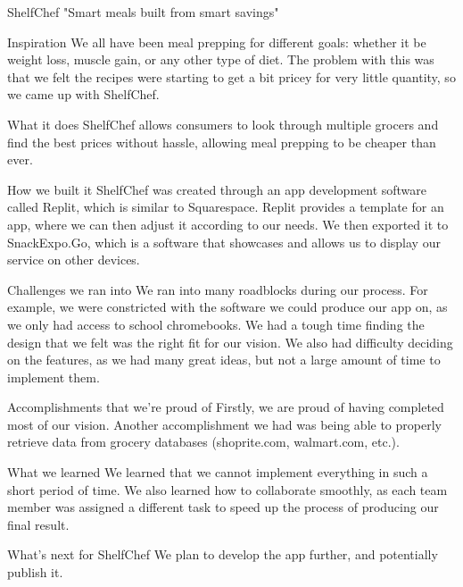 ShelfChef
"Smart meals built from smart savings"

Inspiration
We all have been meal prepping for different goals: whether it be weight loss, muscle gain, or any other type of diet. The problem with this was that we felt the recipes were starting to get a bit pricey for very little quantity, so we came up with ShelfChef.

What it does
ShelfChef allows consumers to look through multiple grocers and find the best prices without hassle, allowing meal prepping to be cheaper than ever.

How we built it
ShelfChef was created through an app development software called Replit, which is similar to Squarespace. Replit provides a template for an app, where we can then adjust it according to our needs. We then exported it to SnackExpo.Go, which is a software that showcases and allows us to display our service on other devices.

Challenges we ran into
We ran into many roadblocks during our process. For example, we were constricted with the software we could produce our app on, as we only had access to school chromebooks. We had a tough time finding the design that we felt was the right fit for our vision. We also had difficulty deciding on the features, as we had many great ideas, but not a large amount of time to implement them.

Accomplishments that we're proud of
Firstly, we are proud of having completed most of our vision. Another accomplishment we had was being able to properly retrieve data from grocery databases (shoprite.com, walmart.com, etc.).

What we learned
We learned that we cannot implement everything in such a short period of time. We also learned how to collaborate smoothly, as each team member was assigned a different task to speed up the process of producing our final result.

What's next for ShelfChef
We plan to develop the app further, and potentially publish it.
